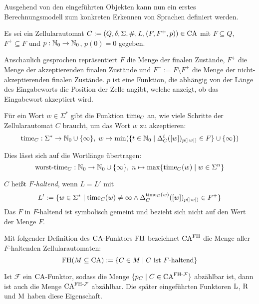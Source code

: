 Ausgehend von den eingeführten Objekten kann nun ein erstes Berechnungsmodell zum konkreten Erkennen von Sprachen definiert werden.

\begin{definition}
    Es sei ein Zellularautomat $C := (Q, \delta, \Sigma, \#, L, (F, F^+, p)) \in \textrm{CA}$
    mit $F \subseteq Q$, $F^+ \subseteq F$ und $p : \mathbb{N}_0 \to \mathbb{N}_0$, $p(0) = 0$ gegeben.
    
    Anschaulich gesprochen repräsentiert $F$ die Menge der finalen Zustände, $F^+$ die Menge der akzeptierenden finalen Zustände und
    $F^- := F \setminus F^+$ die Menge der nicht-akzeptierenden finalen Zustände.
    $p$ ist eine Funktion, die abhängig von der Länge des Eingabeworts die Position der Zelle
    angibt, welche anzeigt, ob das Eingabewort akzeptiert wird.
    
    
    Für ein Wort $w \in \Sigma^*$ gibt die Funktion $\operatorname{time}_{C}$ an, wie viele Schritte der Zellularautomat $C$ braucht, um das Wort $w$ zu akzeptieren:
    \[
        \operatorname{time}_{C}: \Sigma^* \to \mathbb{N}_0 \cup \{ \infty \}, \; w \mapsto \min (\{ { t \in \mathbb{N}_0 } \; | \; { \Delta_C^t([w])_{p(|w|)} \in F } \} \cup \{ \infty \})
    \]
    
    Dies lässt sich auf die Wortlänge übertragen:
    \[
        \operatorname{worst-time}_{C}: \mathbb{N}_0 \to \mathbb{N}_0 \cup \{ \infty \}, \;  n \mapsto \max \{ { \operatorname{time}_{C}(w) } \; | \; { w \in \Sigma^n } \}
    \]
    
    $C$ heißt \emph{$F$-haltend}, wenn $L = L'$ mit
    \[
        L' := \{ { w \in \Sigma^* } \; | \; { 
            \operatorname{time}_{C}(w) \neq \infty \wedge \Delta_C^{\operatorname{time}_{C}(w)}([w])_{p(|w|)} \in F^+ } \}
    \]
    Das $F$ in $F$-haltend ist symbolisch gemeint und bezieht sich nicht auf den Wert der Menge $F$.
    
    Mit folgender Definition des $\textrm{CA}$-Funktors $\textrm{FH}$ bezeichnet $\textrm{CA}^{\textrm{FH}}$ die Menge aller $F$-haltenden Zellularautomaten:
    \[
        \textrm{FH}(M \subseteq \textrm{CA}) := \{ { C \in M } \; | \; { C \text{ ist $F$-haltend} } \}
    \]
    
    Ist $\mathcal{F}$ ein $\textrm{CA}$-Funktor, sodass die Menge $\{ {p_C} \; | \; {C \in \textrm{CA}^{\textrm{FH} \text{-} \mathcal{F}}} \}$ abzählbar ist,
    dann ist auch die Menge $\textrm{CA}^{\textrm{FH} \text{-} \mathcal{F}}$ abzählbar.
    Die später eingeführten Funktoren $\textrm{L}$, $\textrm{R}$ und $\textrm{M}$ haben diese Eigenschaft.
\end{definition}

\begin{comment}
\begin{definition}[Entscheider]
    Ein $F$-haltender Zellularautomat $C$ heißt Entscheider, wenn $\cworsttime_C(\Nz) \subseteq \Nz$,
    $\ctime_C$ also nie den Wert $\infty$ annimmt.
\end{definition}
\end{comment}

